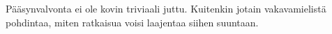 Pääsynvalvonta ei ole kovin triviaali juttu. Kuitenkin jotain vakavamielistä pohdintaa, miten ratkaisua voisi laajentaa siihen suuntaan.